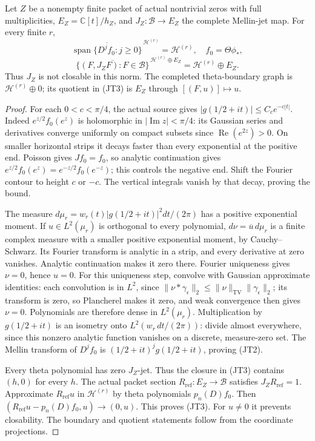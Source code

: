 \begin{theorem}
\label{thm:jet-graph}
Let \(Z\) be a nonempty finite packet of actual nontrivial zeros with full
multiplicities, \(E_Z=\mathbb C[t]/h_Z\), and \(J_Z:\mathscr B\to E_Z\)
the complete Mellin-jet map. For every finite \(r\),
\[
 \overline{\operatorname{span}\{D^jf_0:j\geq0\}}^{\,\mathscr H^{(r)}}
       =\mathscr H^{(r)},\quad f_0=\Theta\phi_*,
 \tag{JT2}
\]
\[
 \overline{\{(F,J_ZF):F\in\mathscr B\}}^{\,\mathscr H^{(r)}\oplus E_Z}
       =\mathscr H^{(r)}\oplus E_Z .
 \tag{JT3}
\]
Thus \(J_Z\) is not closable in this norm. The completed theta-boundary
graph is \(\mathscr H^{(r)}\oplus0\); its quotient in (JT3) is \(E_Z\)
through \([(F,u)]\mapsto u\).
\end{theorem}
\begin{proof}
For each \(0<c<\pi/4\), the actual source gives
\(|g(1/2+it)|\leq C_c e^{-c|t|}\).
Indeed \(e^{z/2}f_0(e^z)\) is holomorphic in
\(|\operatorname{Im}z|<\pi/4\): its Gaussian series and derivatives
converge uniformly on compact subsets since
\(\operatorname{Re}(e^{2z})>0\). On smaller horizontal strips it decays
faster than every exponential at the positive end.
Poisson gives \(Jf_0=f_0\), so analytic continuation gives
\(e^{z/2}f_0(e^z)=e^{-z/2}f_0(e^{-z})\); this controls the negative end.
Shift the Fourier contour to height \(c\) or \(-c\).
The vertical integrals vanish by that decay, proving the bound.

The measure \(d\mu_r=w_r(t)|g(1/2+it)|^2dt/(2\pi)\) has a positive
exponential moment. If \(u\in L^2(\mu_r)\) is orthogonal to every
polynomial, \(d\nu=\overline u\,d\mu_r\) is a finite complex measure
with a smaller positive exponential moment, by Cauchy--Schwarz.
Its Fourier transform is analytic in a strip, and every derivative
at zero vanishes. Analytic continuation makes it zero there.
Fourier uniqueness gives \(\nu=0\), hence \(u=0\).
For this uniqueness step, convolve with Gaussian approximate
identities: each convolution is in \(L^2\), since
\(\|\nu*\gamma_\epsilon\|_2\leq
\|\nu\|_{\mathrm{TV}}\|\gamma_\epsilon\|_2\);
its transform is zero, so Plancherel makes it zero, and
weak convergence then gives \(\nu=0\).
Polynomials are therefore dense in \(L^2(\mu_r)\).
Multiplication by \(g(1/2+it)\) is an isometry onto
\(L^2(w_r\,dt/(2\pi))\): divide almost everywhere, since this nonzero
analytic function vanishes on a discrete, measure-zero set.
The Mellin transform of \(D^jf_0\) is
\((1/2+it)^jg(1/2+it)\), proving (JT2).

Every theta polynomial has zero \(J_Z\)-jet. Thus the closure in (JT3)
contains \((h,0)\) for every \(h\). The actual packet section
\(R_{\mathrm{ref}}:E_Z\to\mathscr B\) satisfies \(J_ZR_{\mathrm{ref}}=1\).
Approximate \(R_{\mathrm{ref}}u\) in \(\mathscr H^{(r)}\) by theta polynomials
\(p_n(D)f_0\). Then
\((R_{\mathrm{ref}}u-p_n(D)f_0,u)\to(0,u)\).
This proves (JT3). For \(u\neq0\) it prevents closability.
The boundary and quotient statements follow from the coordinate
projections.
\end{proof}

